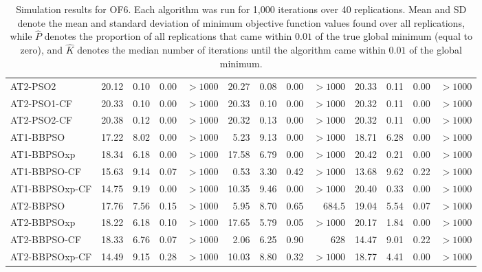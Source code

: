 \documentclass[cmbright]{staauth}
\numberwithin{table}{section}
\begin{document}
\begin{table}[ht]
\begin{tabular}{l|rrrr|rrrr|rrrr}
  AT2-PSO2 & 20.12 & 0.10 & 0.00 & $> 1000$ & 20.27 & 0.08 & 0.00 & $> 1000$ & 20.33 & 0.11 & 0.00 & $> 1000$ \\
  AT2-PSO1-CF & 20.33 & 0.10 & 0.00 & $> 1000$ & 20.33 & 0.10 & 0.00 & $> 1000$ & 20.32 & 0.11 & 0.00 & $> 1000$ \\
  AT2-PSO2-CF & 20.38 & 0.12 & 0.00 & $> 1000$ & 20.32 & 0.13 & 0.00 & $> 1000$ & 20.32 & 0.11 & 0.00 & $> 1000$ \\
   \hline
AT1-BBPSO & 17.22 & 8.02 & 0.00 & $> 1000$ & 5.23 & 9.13 & 0.00 & $> 1000$ & 18.71 & 6.28 & 0.00 & $> 1000$ \\
  AT1-BBPSOxp & 18.34 & 6.18 & 0.00 & $> 1000$ & 17.58 & 6.79 & 0.00 & $> 1000$ & 20.42 & 0.21 & 0.00 & $> 1000$ \\
  AT1-BBPSO-CF & 15.63 & 9.14 & 0.07 & $> 1000$ & 0.53 & 3.30 & 0.42 & $> 1000$ & 13.68 & 9.62 & 0.22 & $> 1000$ \\
  AT1-BBPSOxp-CF & 14.75 & 9.19 & 0.00 & $> 1000$ & 10.35 & 9.46 & 0.00 & $> 1000$ & 20.40 & 0.33 & 0.00 & $> 1000$ \\
   \hline
AT2-BBPSO & 17.76 & 7.56 & 0.15 & $> 1000$ & 5.95 & 8.70 & 0.65 & 684.5 & 19.04 & 5.54 & 0.07 & $> 1000$ \\
  AT2-BBPSOxp & 18.22 & 6.18 & 0.10 & $> 1000$ & 17.65 & 5.79 & 0.05 & $> 1000$ & 20.17 & 1.84 & 0.00 & $> 1000$ \\
  AT2-BBPSO-CF & 18.33 & 6.76 & 0.07 & $> 1000$ & 2.06 & 6.25 & 0.90 & 628 & 14.47 & 9.01 & 0.22 & $> 1000$ \\
  AT2-BBPSOxp-CF & 14.49 & 9.15 & 0.28 & $> 1000$ & 10.03 & 8.80 & 0.32 & $> 1000$ & 18.77 & 4.41 & 0.00 & $> 1000$ \\
   \hline
\end{tabular}
\endgroup
\caption{Simulation results for OF6. Each algorithm was run for 1,000 iterations over 40 replications. Mean and SD denote the mean and standard deviation of minimum objective function values found over all replications, while $\widehat{P}$ denotes the proportion of all replications that came within $0.01$ of the true global minimum (equal to zero), and $\widehat{K}$ denotes the median number of iterations until the algorithm came within $0.01$ of the global minimum.}
\label{tab:psosim6}
\end{table}


\end{document}
